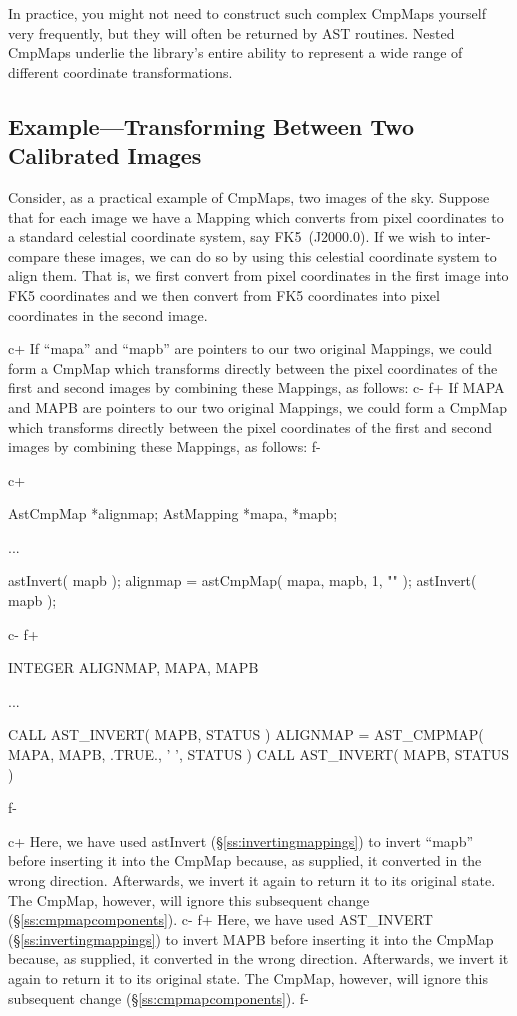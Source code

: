 \documentclass[twoside,11pt]{starlink}
\providecommand{\secref}[1]{\S\ref{#1}}
\begin{document}
In practice, you might not need to construct such complex CmpMaps
yourself very frequently, but they will often be returned by AST
routines.  Nested CmpMaps underlie the library's entire ability to
represent a wide range of different coordinate transformations.

\subsection{\label{ss:cmpmapexample}Example---Transforming Between Two Calibrated Images}

Consider, as a practical example of CmpMaps, two images of the
sky. Suppose that for each image we have a Mapping which converts from
pixel coordinates to a standard celestial coordinate system, say
FK5~(J2000.0). If we wish to inter-compare these images, we can do so
by using this celestial coordinate system to align them. That is, we
first convert from pixel coordinates in the first image into FK5
coordinates and we then convert from FK5 coordinates into pixel
coordinates in the second image.

c+
If ``mapa'' and ``mapb'' are pointers to our two original Mappings, we
could form a CmpMap which transforms directly between the pixel
coordinates of the first and second images by combining these
Mappings, as follows:
c-
f+
If MAPA and MAPB are pointers to our two original Mappings, we could
form a CmpMap which transforms directly between the pixel coordinates
of the first and second images by combining these Mappings, as
follows:
f-

c+
\small
\begin{terminalv}
AstCmpMap *alignmap;
AstMapping *mapa, *mapb;

...

astInvert( mapb );
alignmap = astCmpMap( mapa, mapb, 1, "" );
astInvert( mapb );
\end{terminalv}
\normalsize
c-
f+
\small
\begin{terminalv}
      INTEGER ALIGNMAP, MAPA, MAPB

      ...

      CALL AST_INVERT( MAPB, STATUS )
      ALIGNMAP = AST_CMPMAP( MAPA, MAPB, .TRUE., ' ', STATUS )
      CALL AST_INVERT( MAPB, STATUS )
\end{terminalv}
\normalsize
f-

c+
Here, we have used astInvert (\secref{ss:invertingmappings}) to invert
``mapb'' before inserting it into the CmpMap because, as supplied, it
converted in the wrong direction. Afterwards, we invert it again to
return it to its original state. The CmpMap, however, will ignore this
subsequent change (\secref{ss:cmpmapcomponents}).
c-
f+
Here, we have used AST\_INVERT (\secref{ss:invertingmappings}) to
invert MAPB before inserting it into the CmpMap because, as supplied,
it converted in the wrong direction. Afterwards, we invert it again to
return it to its original state. The CmpMap, however, will ignore this
subsequent change (\secref{ss:cmpmapcomponents}).
f-
\end{document}
